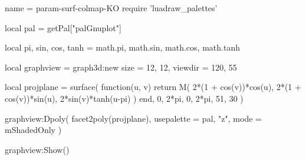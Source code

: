 \documentclass{standalone}
\begin{document}
\begin{luadraw}{name = param-surf-colmap-KO}
require 'luadraw_palettes'

local pal = getPal["palGnuplot"]

local pi, sin, cos, tanh = math.pi, math.sin, math.cos, math.tanh

local graphview = graph3d:new{
  size    = {12, 12},
  viewdir = {120, 55}
}

local projplane = surface(
  function(u, v)
    return M(
      2*(1 + cos(v))*cos(u),
      2*(1 + cos(v))*sin(u),
      2*sin(v)*tanh(u-pi)
    )
  end,
  0, 2*pi, 0,  2*pi,
  {51, 30}
)

graphview:Dpoly(
  facet2poly(projplane), 
  {
    usepalette = {pal, "z"},
    mode       = mShadedOnly
  }
)


graphview:Show()
\end{luadraw}
\end{document}
